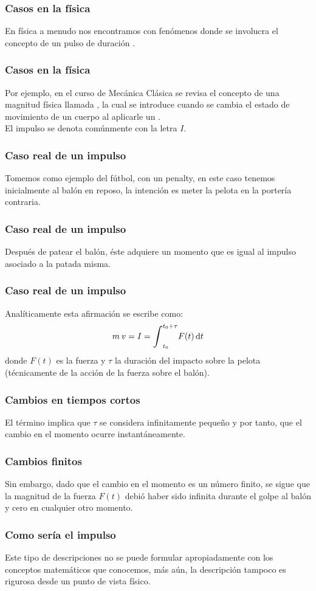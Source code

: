 \documentclass[12pt]{beamer}
\begin{document}
\begin{frame}
\frametitle{Casos en la física}
En física a menudo nos encontramos con fenómenos donde se involucra el concepto de un pulso de duración .
\end{frame}
\begin{frame}
\frametitle{Casos en la física}
Por ejemplo, en el curso de Mecánica Clásica se revisa el concepto de una magnitud física llamada , \pause la cual se introduce cuando se cambia el estado de movimiento de un cuerpo al aplicarle un .
\\
\bigskip
\pause
El impulso se denota comúnmente con la letra $I$.
\end{frame}
\begin{frame}
\frametitle{Caso real de un impulso}
Tomemos como ejemplo del fútbol, con un penalty, \pause en este caso tenemos inicialmente al balón en reposo, la intención es meter la pelota en la portería contraria.
\end{frame}
\begin{frame}
\frametitle{Caso real de un impulso}
Después de patear el balón, éste adquiere un momento que es igual al impulso asociado a la patada misma.
\end{frame}
\begin{frame}
\frametitle{Caso real de un impulso}
Analíticamente esta afirmación se escribe como:
\pause
\begin{align*}
m \: v = I = \scaleint{6ex}_{t_{0}}^{t_{0} + \tau} F (t) \dd{t}
\end{align*}
donde $F(t)$ es la fuerza y $\tau$ la duración del impacto sobre la pelota (técnicamente de la acción de la fuerza sobre el balón).
\end{frame}
\begin{frame}
\frametitle{Cambios en tiempos cortos}
El término  implica que $\tau$ se considera infinitamente pequeño y por tanto, que el cambio en el momento ocurre instantáneamente.
\end{frame}
\begin{frame}
\frametitle{Cambios finitos}
Sin embargo, dado que el cambio en el momento es un número finito, \pause se sigue que la magnitud de la fuerza $F (t)$ debió haber sido infinita durante el golpe al balón y cero en cualquier otro momento.
\end{frame}
\begin{frame}
\frametitle{Como sería el impulso}
Este tipo de descripciones no se puede formular apropiadamente con los conceptos matemáticos que conocemos, más aún, la descripción tampoco es rigurosa desde un punto de vista físico.
\end{frame}
\end{document}
